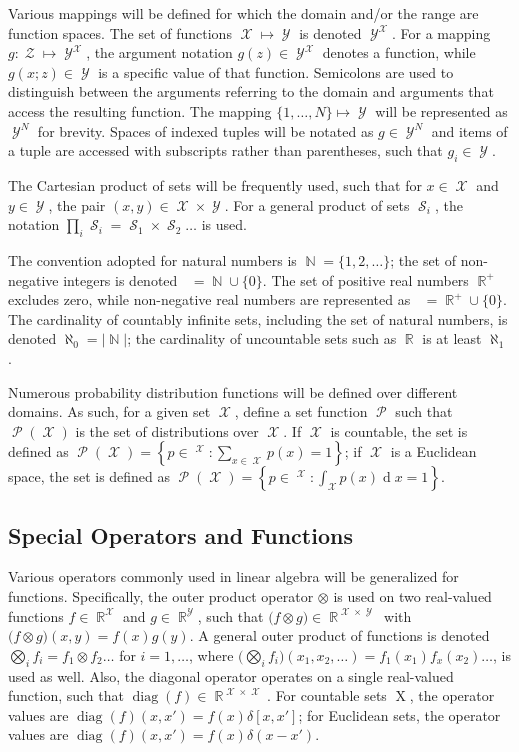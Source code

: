 \documentclass[12pt]{report}
\newcommand{\todolo}[1]{\todo[inline,color=green!50,linecolor=red]{#1}}
\DeclareMathOperator{\diag}{\mathrm{diag}}
\DeclareMathOperator{\Xrm}{\mathrm{X}}
\DeclareMathOperator{\drm}{\mathrm{d}}
\DeclareMathOperator{\Xcal}{\mathcal{X}}
\DeclareMathOperator{\Ycal}{\mathcal{Y}}
\DeclareMathOperator{\Zcal}{\mathcal{Z}}
\DeclareMathOperator{\Scal}{\mathcal{S}}
\DeclareMathOperator{\Pcal}{\mathcal{P}}
\DeclareMathOperator{\Rbb}{\mathbb{R}}
\DeclareMathOperator{\Rbbgeq}{\mathbb{R}_{\geq 0}}
\DeclareMathOperator{\Nbb}{\mathbb{N}}
\DeclareMathOperator{\Zbbgeq}{\mathbb{Z}_{\geq 0}}
\begin{document}
Various mappings will be defined for which the domain and/or the range \cite{rudin} are function spaces. The set of functions $\Xcal \mapsto \Ycal$ is denoted $\Ycal^{\Xcal}$. For a mapping $g : \Zcal \mapsto \Ycal^{\Xcal}$, the argument notation $g(z) \in \Ycal^{\Xcal}$ denotes a function, while $g(x;z) \in \Ycal$ is a specific value of that function. Semicolons are used to distinguish between the arguments referring to the domain and arguments that access the resulting function. The mapping $\{1,\ldots,N\} \mapsto \Ycal$ will be represented as $\Ycal^N$ for brevity. Spaces of indexed tuples will be notated as $g \in \Ycal^N$ and items of a tuple are accessed with subscripts rather than parentheses, such that $g_i \in \Ycal$.

The Cartesian product of sets will be frequently used, such that for $x \in \Xcal$ and $y \in \Ycal$, the pair $(x,y) \in \Xcal \times \Ycal$. For a general product of sets $\Scal_i$, the notation $\prod_i \Scal_i = \Scal_1 \times \Scal_2 \ldots$ is used.

The convention adopted for natural numbers is $\Nbb = \{1,2,\ldots\}$; the set of non-negative integers is denoted $\Zbbgeq = \Nbb \cup \{0\}$. The set of positive real numbers $\Rbb^+$ excludes zero, while non-negative real numbers are represented as $\Rbbgeq = \Rbb^+ \cup \{0\}$. The cardinality of countably infinite sets, including the set of natural numbers, is denoted $\aleph_0 = |\Nbb|$; the cardinality of uncountable sets such as $\Rbb$ is at least $\aleph_1$.

Numerous probability distribution functions will be defined over different domains. As such, for a given set $\Xcal$, define a set function $\Pcal$ such that $\Pcal(\Xcal)$ is the set of distributions over $\Xcal$. If $\Xcal$ is countable, the set is defined as $\Pcal(\Xcal) = \left\{ p \in {\Rbbgeq}^{\Xcal}: \sum_{x \in \Xcal} p(x) = 1 \right\}$; if $\Xcal$ is a Euclidean space, the set is defined as $\Pcal(\Xcal) = \left\{ p \in {\Rbbgeq}^{\Xcal}: \int_{\Xcal} p(x) {\drm}x = 1 \right\}$.

\todolo{aleph reference?}



\subsection*{Special Operators and Functions}

Various operators commonly used in linear algebra will be generalized for functions. Specifically, the outer product operator $\otimes$ is used on two real-valued functions $f \in \Rbb^{\Xcal}$ and $g \in \Rbb^{\Ycal}$, such that $\big(f \otimes g\big) \in \Rbb^{\Xcal \times \Ycal}$ with $\big(f \otimes g\big) (x,y) = f(x) g(y)$. A general outer product of functions is denoted $\bigotimes_i f_i = f_1 \otimes f_2 \ldots$ for $i = 1,\ldots$, where $\Big(\bigotimes_i f_i\Big)(x_1,x_2,\ldots) = f_1(x_1)f_x(x_2)\ldots$, is used as well. Also, the diagonal operator operates on a single real-valued function, such that $\diag(f) \in \Rbb^{\Xcal \times \Xcal}$. For countable sets $\Xrm$, the operator values are $\diag(f)(x,x') = f(x) \delta[x,x']$; for Euclidean sets, the operator values are $\diag(f)(x,x') = f(x) \delta(x-x')$.
\end{document}

